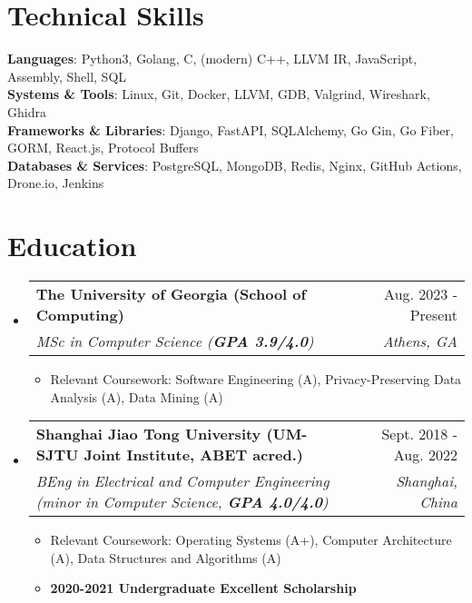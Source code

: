 \documentclass[letterpaper,11pt]{article}
\makeatletter
\newcommand{\resumeItem}[1]{
  \item\small{
    {#1 \vspace{-2pt}}
  }
}
\newcommand{\resumeSubHeader}[4]{
  \vspace{-2pt}\item
    \begin{tabular*}{0.98\textwidth}[t]{l@{\extracolsep{\fill}}r}
      \textbf{#1} & #2 \\
      \textit{\small#3} & \textit{\small #4} \\
    \end{tabular*}\vspace{-7pt}
}
\newcommand{\resumeSubHeaderListStart}{\begin{itemize}[leftmargin=0.15in, label={}]}
\newcommand{\resumeSubHeaderListEnd}{\end{itemize}}
\newcommand{\resumeItemListStart}{\begin{itemize}}
\newcommand{\resumeItemListEnd}{\end{itemize}\vspace{-5pt}}
\makeatother
\begin{document}
\section{Technical Skills}
 \begin{itemize}[leftmargin=0.15in, label={}]
    \small{
      \item{
     \textbf{Languages}{: Python3, Golang, C, (modern) C++, LLVM IR, JavaScript, Assembly, Shell, SQL} \\
     \textbf{Systems \& Tools}{: Linux, Git, Docker, LLVM, GDB, Valgrind, Wireshark, Ghidra} \\
     \textbf{Frameworks \& Libraries}{: Django, FastAPI, SQLAlchemy, Go Gin, Go Fiber, GORM, React.js, Protocol Buffers} \\
     \textbf{Databases \& Services}{: PostgreSQL, MongoDB, Redis, Nginx, GitHub Actions, Drone.io, Jenkins}
    }}
 \end{itemize}

\section{Education}
  \resumeSubHeaderListStart
    \resumeSubHeader
      {The University of Georgia (School of Computing)}{Aug. 2023 - Present}
      {MSc in Computer Science (\textbf{GPA 3.9/4.0})}{Athens, GA}
      \resumeItemListStart
        \resumeItem{Relevant Coursework: Software Engineering (A), Privacy-Preserving Data Analysis (A), Data Mining (A)}
      \resumeItemListEnd
    \resumeSubHeader
      {Shanghai Jiao Tong University (UM-SJTU Joint Institute, ABET acred.)}{Sept. 2018 - Aug. 2022}
      {BEng in Electrical and Computer Engineering (minor in Computer Science, \textbf{GPA 4.0/4.0})}{Shanghai, China}
      \resumeItemListStart
        \resumeItem{Relevant Coursework: Operating Systems (A+), Computer Architecture (A), Data Structures and Algorithms (A)}
        \resumeItem{\textbf{2020-2021 Undergraduate Excellent Scholarship}}
      \resumeItemListEnd
  \resumeSubHeaderListEnd
\end{document}
